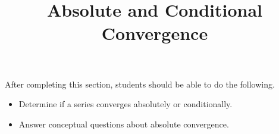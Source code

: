 \documentclass{ximera}
\title{Absolute and Conditional Convergence}
\begin{document}
\begin{abstract}
\end{abstract}

\maketitle

\begin{sectionOutcomes}

After completing this section, students should be able to do the following.


\begin{itemize}
\item Determine if a series converges absolutely or conditionally.
\item Answer conceptual questions about absolute convergence.
\end{itemize}

\end{sectionOutcomes}
\end{document}
